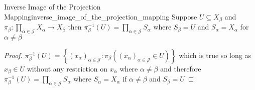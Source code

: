 \begin{proposition}{Inverse Image of the Projection
Mapping}{inverse_image_of_the_projection_mapping}
Suppose \( U \subseteq X _{ \beta  }  \)  and \( \pi  _{ \beta  }  : \prod _{
\alpha \in \mathcal{ J }   } X _{ \alpha  }  \to X _{ \beta  }   \) then \( \pi  _{ \beta  } ^{-1} \left( U
\right) = \prod _{ \alpha \in \mathcal{ J }   } S _{ \alpha  }  \) where \( S _{
\beta } = U \) and \( S _{ \alpha  } =  X _{ \alpha  }   \) for \( \alpha \neq \beta  \) 
\end{proposition}
\begin{proof}
    \( \pi  _{ \beta  } ^{-1} \left( U \right) = \left\{ \left( x _{ \alpha  }
    \right) _{ \alpha \in  \mathcal{ J }   } : \pi _{ \beta  } \left( \left( x
    _{ \alpha  }  \right) _{ \alpha  \in  \mathcal{ J }   } \in  U \right)
    \right\} \) which is true so long as \( x _{ \beta  } \in  U \) without any
    restriction on \( x _{ \alpha  }  \) where \( \alpha \neq \beta  \) and
    therefore \( \pi _{ \beta  } ^{-1} \left( U \right) = \prod _{ \alpha \in
    \mathcal{ J }   } S _{ \alpha  }  \) where \( S _{ \alpha  } = X _{ \alpha
    }  \) if \( \alpha  \neq \beta  \) and \( S _{ \beta  } = U \) 
\end{proof}
